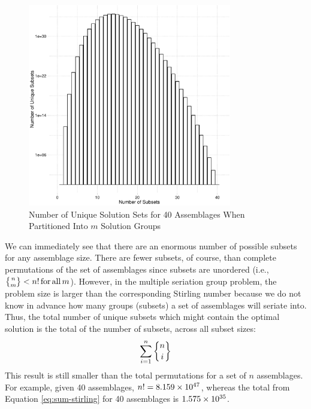 \begin{figure}
\includegraphics[width=3.5in]{graphics/seriationcombinatorics/subsets-graph-1.pdf} \caption[Number of Unique Solution Sets for 40 Assemblages When Partitioned Into ]{Number of Unique Solution Sets for 40 Assemblages When Partitioned Into $m$ Solution Groups\label{fig:subsets-graph}}
\end{figure}



We can immediately see that there are an enormous number of possible subsets for any assemblage size.  There are fewer subsets, of course, than complete permutations of the set of assemblages since subsets are unordered (i.e., $\stirlingsubset{n}{m} < n! \,\mathrm{for\,all }\,m$).  However, in the multiple seriation group problem, the problem size is larger than the corresponding Stirling number because we do not know in advance how many groups (subsets) a set of assemblages will seriate into.  Thus, the total number of unique subsets which might contain the optimal solution is the total of the number of subsets, across all subset sizes:
\begin{equation}
\sum_{i=1}^n \stirlingsubset{n}{i}
\label{eq:sum-stirling}
\end{equation}
This result is still smaller than the total permutations for a set of $n$ assemblages.  For example, given 40 assemblages, $n! = 8.159\times 10^{47}$, whereas the total from Equation \ref{eq:sum-stirling} for 40 assemblages is $1.575\times 10^{35}$.  

